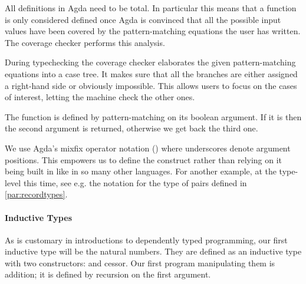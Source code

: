 \begin{minipage}{0.5\textwidth}
\end{minipage}\begin{minipage}{0.5\textwidth}
\end{minipage}

All definitions in Agda need to be total. In particular this means that a
function is only considered defined once Agda is convinced that all the
possible input values have been covered by the pattern-matching equations
the user has written. The coverage checker performs this analysis.

\begin{feature} During typechecking the coverage checker
elaborates the given pattern-matching equations into a case tree. It makes
sure that all the branches are either assigned a right-hand side or obviously
impossible. This allows users to focus on the cases of interest, letting the
machine check the other ones.
\end{feature}

The function  is defined by pattern-matching on its
boolean argument. If it is  then the second argument is returned,
otherwise we get back the third one.


\begin{feature} We use Agda's mixfix operator notation
(\cite{danielsson2011parsing}) where underscores denote argument positions.
This empowers us to define the  construct rather than
relying on it being built in like in so many other languages. For another
example, at the type-level this time, see e.g. the notation  for
the type of pairs defined in \cref{par:recordtypes}.
\end{feature}

\paragraph{Inductive Types}

As is customary in introductions to dependently typed programming, our first
inductive type will be the natural numbers. They are defined as an inductive
type with two constructors:  and cessor. Our first program
manipulating them is addition; it is defined by recursion on the first argument.

